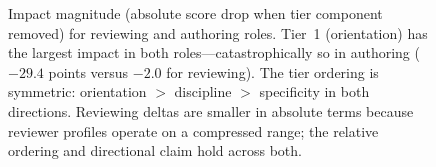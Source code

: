\begin{figure}[t]
\caption{Impact magnitude (absolute score drop when tier component removed) for reviewing
and authoring roles. Tier~1 (orientation) has the largest impact in both roles---catastrophically
so in authoring ($-29.4$ points versus $-2.0$ for reviewing). The tier ordering is symmetric:
orientation $>$ discipline $>$ specificity in both directions. Reviewing deltas are smaller in
absolute terms because reviewer profiles operate on a compressed range; the relative ordering
and directional claim hold across both.}
\label{fig:heatmap}
\end{figure}

